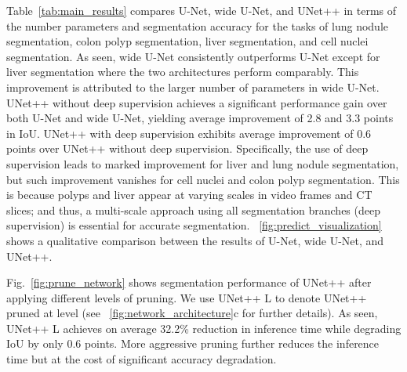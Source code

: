 \documentclass[runningheads]{llncs}
\begin{document}
\vspace{4pt}
Table~\ref{tab:main_results} compares U-Net, wide U-Net, and UNet++ in terms of the number parameters and segmentation accuracy for the tasks of lung nodule segmentation, colon polyp segmentation, liver segmentation, and cell nuclei segmentation. As seen, wide U-Net consistently outperforms U-Net except for liver segmentation where the two architectures perform comparably. This improvement is attributed to the larger number of parameters in wide U-Net. UNet++ without deep supervision achieves a significant performance gain over both U-Net and wide U-Net, yielding  average improvement of 2.8 and 3.3 points in IoU. UNet++ with deep supervision exhibits average improvement of 0.6 points over UNet++ without deep supervision. Specifically,  the use of deep supervision leads to marked improvement for liver and lung nodule segmentation, but such improvement vanishes for cell nuclei and colon polyp segmentation. This is because polyps and liver appear at varying scales in video frames and CT slices; and thus, a multi-scale approach using all segmentation branches (deep supervision) is essential for accurate segmentation. \figurename~\ref{fig:predict_visualization} shows a qualitative comparison between the results of U-Net, wide U-Net, and UNet++.




\vspace{4pt}
 Fig.~\ref{fig:prune_network} shows  segmentation performance of UNet++ after applying different levels of pruning. We use UNet++ L to denote UNet++ pruned at level  (see \figurename~\ref{fig:network_architecture}c for further details). As seen, UNet++ L achieves on average 32.2\% reduction in inference time while degrading IoU by only 0.6 points.  More aggressive pruning further reduces the inference time but at the cost of significant accuracy degradation.
\end{document}

